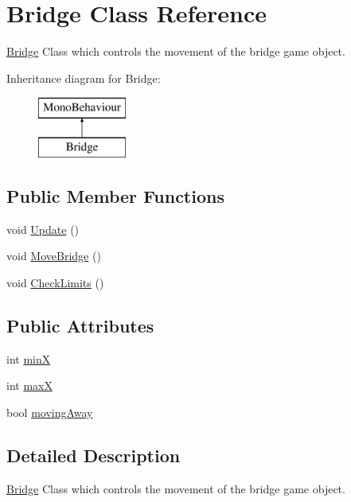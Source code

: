 \hypertarget{class_bridge}{\section{Bridge Class Reference}
\label{class_bridge}
}


\hyperlink{class_bridge}{Bridge} Class which controls the movement of the bridge game object.  


Inheritance diagram for Bridge\-:\begin{figure}[H]
\begin{center}
\leavevmode
\includegraphics[height=2.000000cm]{class_bridge}
\end{center}
\end{figure}
\subsection*{Public Member Functions}
\begin{DoxyCompactItemize}
\item 
void \hyperlink{class_bridge_a47f522a3036991987a36b9f9973451a0}{Update} ()
\item 
void \hyperlink{class_bridge_abbbe8535ff12e12be4dab4b68c0abf66}{Move\-Bridge} ()
\item 
void \hyperlink{class_bridge_aef567fac8751861171b79fa98014faef}{Check\-Limits} ()
\end{DoxyCompactItemize}
\subsection*{Public Attributes}
\begin{DoxyCompactItemize}
\item 
int \hyperlink{class_bridge_af027428ee13264f7027c58609c8ad9f9}{min\-X}
\item 
int \hyperlink{class_bridge_aed083b15a35e1694d1158f47dd4195ef}{max\-X}
\item 
bool \hyperlink{class_bridge_abafb52bd877ba842d7645dd15e2ac85d}{moving\-Away}
\end{DoxyCompactItemize}


\subsection{Detailed Description}
\hyperlink{class_bridge}{Bridge} Class which controls the movement of the bridge game object. 

